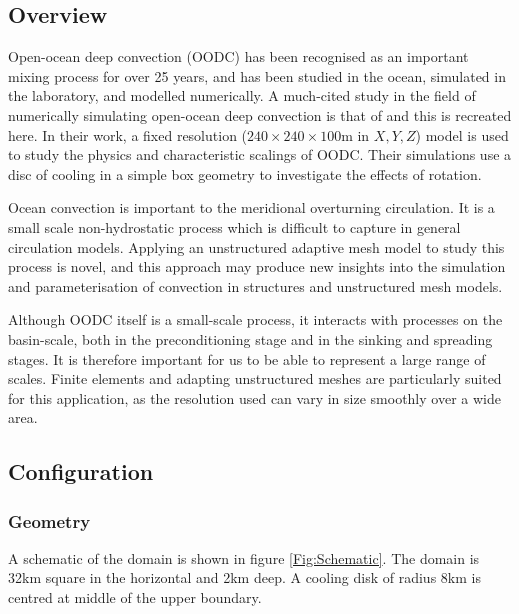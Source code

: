\subsection{Overview}
Open-ocean deep convection (OODC) has been recognised as an
important mixing process for over 25 years, and
has been studied in the ocean, simulated in the laboratory, and modelled numerically.
A much-cited study in the field of numerically simulating
open-ocean deep convection is that of \cite{jones1993} and this is recreated here.
In their work, a fixed resolution ($240 \times 240 \times
100$m in $X, Y, Z$) model is used to study the physics and
characteristic scalings of OODC. Their simulations use a disc
of cooling in a simple box geometry to investigate the effects of rotation.

Ocean convection is important to the meridional overturning
circulation. It is a small scale non-hydrostatic process which
is difficult to capture in general circulation models. Applying
an unstructured adaptive mesh model to study this process is
novel, and this approach may produce new insights into the
simulation and parameterisation of convection in structures and
unstructured mesh models.

Although OODC itself is a small-scale process, it interacts with
processes on the basin-scale, both in the preconditioning stage and
in the sinking and spreading stages. It is therefore important for us
to be able to represent a large range of scales. Finite elements and adapting
unstructured meshes are particularly suited for this application, as the
resolution used can vary in size smoothly over a wide area.

\subsection{Configuration}

\subsubsection{Geometry}



A schematic of the domain is shown in figure \ref{Fig:Schematic}.
The domain is 32km square in the horizontal and 2km deep. A cooling disk of radius
8km is centred at middle of the upper boundary.




